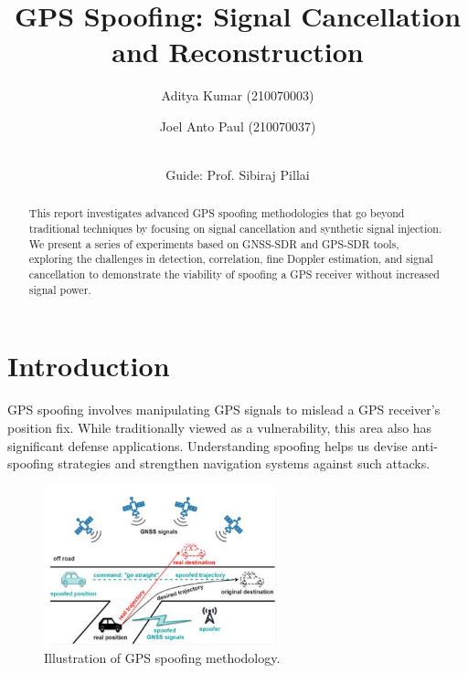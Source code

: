 \documentclass[12pt]{report}
\title{\textbf{GPS Spoofing: Signal Cancellation and Reconstruction}}
\author{Aditya Kumar (210070003) \and Joel Anto Paul (210070037) \\
\and \\
{\large Guide: Prof. Sibiraj Pillai}}
\date{}
\begin{document}
\maketitle

\begin{abstract}
This report investigates advanced GPS spoofing methodologies that go beyond traditional techniques by focusing on signal cancellation and synthetic signal injection. We present a series of experiments based on GNSS-SDR and GPS-SDR tools, exploring the challenges in detection, correlation, fine Doppler estimation, and signal cancellation to demonstrate the viability of spoofing a GPS receiver without increased signal power.
\end{abstract}

\section{Introduction}
GPS spoofing involves manipulating GPS signals to mislead a GPS receiver's position fix. While traditionally viewed as a vulnerability, this area also has significant defense applications. Understanding spoofing helps us devise anti-spoofing strategies and strengthen navigation systems against such attacks.
\begin{figure}[H]
    \centering
    \includegraphics[width=0.6\textwidth]{spoof.png}
    \caption{Illustration of GPS spoofing methodology.}
    \label{fig:spoofing}
\end{figure}
\end{document}
